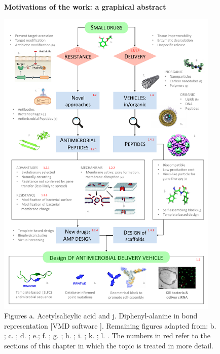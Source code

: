 \begin{figure}[p!]
\begin{center}
\Large{\textbf{Motivations of the work: a graphical abstract}}\par\bigskip
\includegraphics[width = 0.95\textwidth]{1introduction/pics/scheme_intro}
\caption[Graphical abstract of introduction]{Figures a. Acetylsalicylic acid and j. Diphenyl-alanine in bond representation [VMD software \citet{HUMP96}]. Remaining figures adapted from: b. \citet{Blair2014}; c. \citet{phage}; d. \citet{Torres2019}; e.\citet{Nguyen2011}; f. \citet{nanotube}; g. \citet{poly}; h. \citep{lipo}; i. \citet{Schoonen2014}; k. \citet{Castelletto2016}; l. \citet{Kepiro2019}. The numbers in red refer to the sections of this chapter in which the topic is treated in more detail.} \label{fig:intro}
\end{center}
\end{figure}


